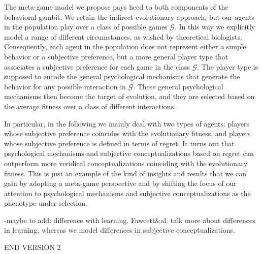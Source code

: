 \documentclass[fleqn,reqno,11pt]{article}
\begin{document}
The meta-game model we propose pays heed to both components of the behavioral gambit. We retain the indirect evolutionary approach, but our agents in the population play over a class of possible games $\mathcal{G}$. In this way we explicitly model a range of different circumstances, as wished by theoretical biologists.  Consequently, each agent in the population does not represent either a simple behavior or a subjective preference, but a more general player type that associates a subjective preference for each game in the class $\mathcal{G}$. The player type is supposed to encode the general psychological mechanisms that generate the behavior for any possible interaction in $\mathcal{G}$. These general psychological mechanisms then become the target of evolution, and they are selected based on the average fitness over a class of different interactions. 

In particular, in the following we mainly deal with two types of agents: players whose subjective preference coincides with the evolutionary fitness, and players whose subjective preference is defined in terms of regret. It turns out that psychological mechanisms and subjective conceptualizations based on regret can outperform more veridical conceptualizations coinciding with the evolutionary fitness.
This is just an example of the kind of insights and results that we can gain by adopting a meta-game perspective and by shifting the focus of our attention to psychological mechanisms and subjective conceptualizations as the phenotype under selection.


-maybe to add: difference with learning. Fawcett\&al. talk more about differences in learning, whereas we model differences in subjective conceptualizations.


END VERSION 2
\end{document}
